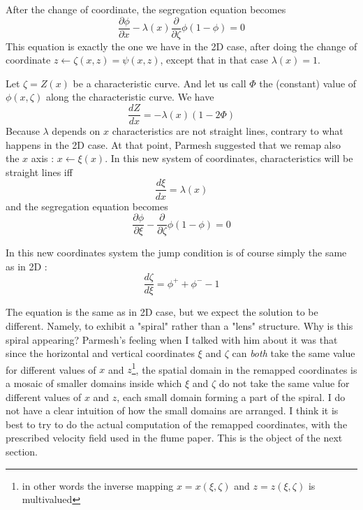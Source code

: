 \documentclass[11pt]{article}
\newcommand{\p}[2]{\ensuremath{\frac{\partial {#1}}{\partial {#2}}}}
\newcommand{\tot}[2]{\ensuremath{\frac{d {#1}}{d {#2}}}}
\newcommand{\z}{\ensuremath{\zeta}}
\newcommand{\x}{\ensuremath{\xi}}
\newcommand{\lam}{\ensuremath{\lambda}}
\begin{document}
After the change of coordinate, the segregation equation \cite{eq:segreg} becomes
\begin{equation}
	\p{\phi}{x} - \lam(x) \p{}{\z} \phi (1 - \phi) = 0
\end{equation}
This equation is exactly the one we have in the 2D case, after doing the change of coordinate $z \leftarrow \z(x,z)=\psi(x,z)$, except that in that case $\lam(x) = 1$.

Let $\z = Z(x)$ be a characteristic curve. And let us call $\Phi$ the (constant) value of  $\phi(x,\z)$ along the characteristic curve. We have
\begin{equation}
	\tot{Z}{x} = - \lam(x) ( 1 - 2 \Phi)
\end{equation}
Because $\lam$ depends on $x$ characteristics are not straight lines, contrary to what happens in the 2D case. 
At that point, Parmesh suggested that we remap also the $x$ axis : $x \leftarrow \x(x)$. 
In this new system of coordinates, characteristics will be straight lines iff
\begin{equation}
	\tot{\x}{x} = \lam(x)
\end{equation}
and the segregation equation becomes
\begin{equation}
	\p{\phi}{\x} - \p{}{\z} \phi (1 - \phi) = 0
\end{equation}

In this new coordinates system the jump condition is of course simply the same as in 2D :
\begin{equation}
	\tot{\z}{\x} = \phi^+ + \phi^-  - 1
\end{equation}

The equation is the same as in 2D case, but we expect the solution to be different. Namely, to exhibit a "spiral" rather than a "lens" structure. 
Why is this spiral appearing? Parmesh's feeling when I talked with him about it was that since the horizontal and vertical coordinates $\x$ and $\z$ can \textit{both} take the same value for different values of $x$ and $z$\footnote{in other words the inverse mapping $x = x(\x, \z)$ and $z = z(\x,\z)$ is multivalued}, the spatial domain in the remapped coordinates is a mosaic of smaller domains inside which $\x$ and $\z$ do not take the same value for different values of $x$ and $z$, each small domain forming a part of the spiral.
I do not have a clear intuition of how the small domains are arranged. I think it is best to try to do the actual computation of the remapped coordinates, with the prescribed velocity field used in the flume paper. This is the object of the next section.
\end{document}
